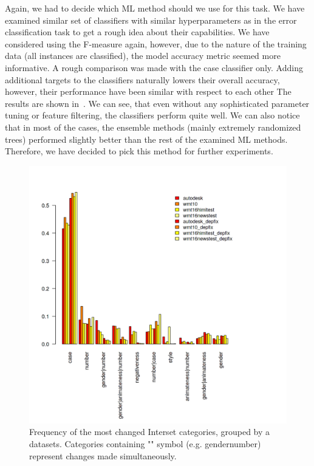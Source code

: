 Again, we had to decide which ML method should we use for this task. 
We have examined similar set of classifiers with similar
hyperparameters as in the error classification task to get a rough idea about their capabilities.
We have considered using the F-measure again, however, due to the nature of the training data (all
instances are classified), the model accuracy metric seemed more informative.
A rough comparison was made with the case classifier only.
Adding additional targets to the classifiers naturally lowers their overall accuracy,
however, their performance have been similar with respect to each other
The results are shown in~. We can see, that even without any sophisticated parameter
tuning or feature filtering, the classifiers perform quite well. We can also notice that in most of the cases, the ensemble
methods (mainly extremely randomized trees) performed slightly better than the rest of the examined ML methods. Therefore, we have decided
to pick this method for further experiments.

\begin{figure}
\centering
  \includegraphics[scale=0.7]{iset}
  \caption{
    Frequency of the most changed Interset categories, grouped by a datasets. Categories containing
    "\textbar" symbol (e.g. gender\textbar{}number) represent changes made simultaneously.
}
  \label{iset-barplot}
\end{figure}


